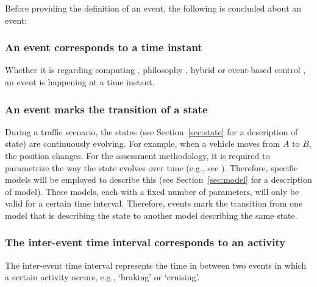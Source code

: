 Before providing the definition of an event, the following is concluded about an event:

\subsubsection{An event corresponds to a time instant}
Whether it is regarding computing \cite{breu1997towards}, philosophy \cite{kim1993supervenience}, %
hybrid or event-based control \cite{branicky1998hybridcontrol, deschutter2000optimal, heemels2012eventcontrol}, an event is happening at a time instant.

\subsubsection{An event marks the transition of a state}
During a traffic scenario, the states (see Section~\ref{sec:state} for a description of state) are continuously evolving. For example, when a vehicle moves from $A$ to $B$, the position changes. For the assessment methodology, it is required to parametrize the way the state evolves over time (e.g., see \cite{deGelder2017assessment}). Therefore, specific models will be employed to describe this (see Section~\ref{sec:model} for a description of model). These models, each with a fixed number of parameters, will only be valid for a certain time interval. Therefore, events mark the transition from one model that is describing the state to another model describing the same state.

\subsubsection{The inter-event time interval corresponds to an activity}
The inter-event time interval represents the time in between two events in which a certain activity occurs, e.g., `braking' or `cruising'.


